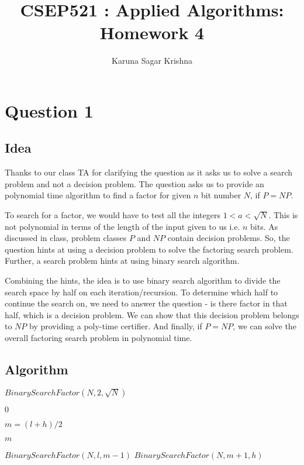 \documentclass{article}
\title{CSEP521 : Applied Algorithms: Homework 4}
\author{Karuna Sagar Krishna}
\begin{document}
    \maketitle

    \section*{Question 1}

    \subsection*{Idea}
    Thanks to our class TA for clarifying the question as it asks us to solve a search problem and not a decision problem. The question asks us to provide an polynomial time algorithm to find a factor for given $n$ bit number $N$, if $P = NP$.

    To search for a factor, we would have to test all the integers $1 < a < \sqrt N$. This is not polynomial in terms of the length of the input given to us i.e. $n$ bits. As discussed in class, problem classes $P$ and $NP$ contain decision problems. So, the question hints at using a decision problem to solve the factoring search problem. Further, a search problem hints at using binary search algorithm.

    Combining the hints, the idea is to use binary search algorithm to divide the search space by half on each iteration/recursion. To determine which half to continue the search on, we need to answer the question - is there factor in that half, which is a decision problem. We can show that this decision problem belongs to $NP$ by providing a poly-time certifier. And finally, if $P = NP$, we can solve the overall factoring search problem in polynomial time.

    \subsection*{Algorithm}
    \begin{algorithm}[H]
        \begin{algorithmic}
                \State \Return $BinarySearchFactor(N, 2, \sqrt N)$
            \EndProcedure

                    \State \Return $0$
                \EndIf
            
                \State $m = (l+h)/2$

                    \State \Return $m$
                \EndIf

                    \State \Return $BinarySearchFactor(N, l, m-1)$
                \Else
                    \State \Return $BinarySearchFactor(N, m+1, h)$
                \EndIf
            \EndProcedure
        \end{algorithmic}
    \end{algorithm}
\end{document}
